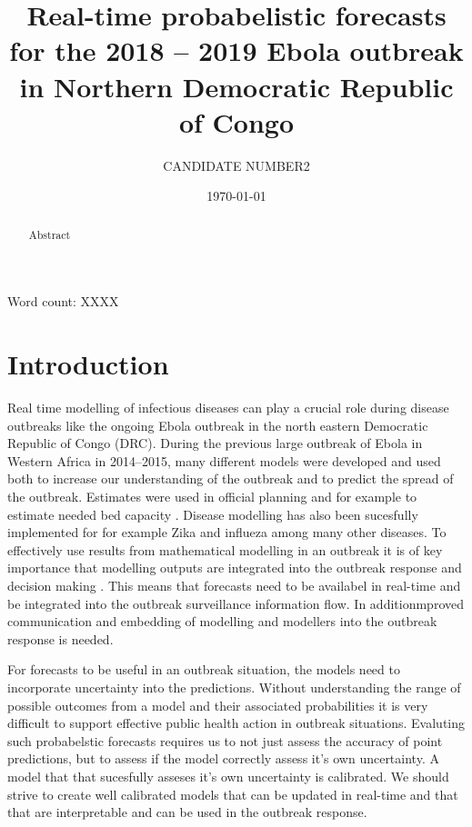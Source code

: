 \documentclass[12pt]{article}
\title{Real-time probabelistic forecasts for the 2018 -- 2019 Ebola outbreak in Northern Democratic Republic of Congo}
\author{
  CANDIDATE NUMBER2
}
\date{\today}
\begin{document}
\maketitle


Word count: XXXX

\begin{abstract}
  Abstract

\end{abstract}

\newpage

\tableofcontents

\newpage

\section{Introduction}


Real time modelling of infectious diseases can play a crucial role during disease outbreaks like the ongoing Ebola outbreak in the north eastern Democratic Republic of Congo (DRC). During the previous large outbreak of Ebola in Western Africa in 2014--2015, many different models were developed\cite{chretienMathematicalModelingWest} and used both to increase our understanding of the outbreak and to predict the spread of the outbreak. Estimates were used in official planning\cite{EbolaVirusDisease2014}  and for example to estimate needed bed capacity \cite{camachoTemporalChangesEbola2015}. Disease modelling has also been sucesfully implemented for for example Zika \cite{kobresSystematicReviewEvaluation2019} and influeza \cite{chretienInfluenzaForecastingHuman2014} among many other diseases. To effectively use results from mathematical modelling in an outbreak it is of key importance that modelling outputs are integrated into the outbreak response and decision making \cite{riversUsingOutbreakScience2019a}. This means that forecasts need to be availabel in real-time and be integrated into the outbreak surveillance information flow. In additionmproved communication and embedding of modelling and modellers into the outbreak response is needed. 

For forecasts to be useful in an outbreak situation, the models need to incorporate uncertainty into the predictions\cite{funkAssessingPerformanceRealtime2019, weiCalibrationTestsCount2014,gneitingEditorialProbabilisticForecasting2008}. Without understanding the range of possible outcomes from a model and their associated probabilities it is very difficult to support effective public health action in outbreak situations. Evaluting such probabelstic forecasts requires us to not just assess the accuracy of point predictions, but to assess if the model correctly assess it's own uncertainty. A model that that sucesfully asseses it's own uncertainty is calibrated. We should strive to create well calibrated models that can be updated in real-time and that that are interpretable and can be used in the outbreak response. 
\end{document}
